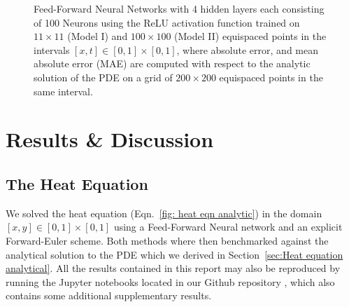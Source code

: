 \documentclass[reprint, english, nofootinbib]{revtex4-2}
\begin{document}
\begin{figure}[h!tb]
{    }
    \caption{\label{fig:ReLU composite figure}Feed-Forward Neural Networks with 4 hidden layers each consisting of 100 Neurons using the ReLU activation function trained on $11\times11$ (Model I) and $100\times100$ (Model II) equispaced points in the intervals $[x,t]\in[0,1]\times[0,1]$, where absolute error, and mean absolute error (MAE) are computed with respect to the analytic solution of the PDE on a grid of $200\times200$ equispaced points in the same interval.}
\end{figure}

\section{Results \& Discussion}

\subsection{The Heat Equation}

\noindent
We solved the heat equation (Eqn.~\ref{fig: heat eqn analytic}) in the domain $[x,y] \in [0,1]\times[0,1]$ using a Feed-Forward Neural network and an explicit Forward-Euler scheme. Both methods where then benchmarked against the analytical solution to the PDE which we derived in Section~\ref{sec:Heat equation analytical}. All the results contained in this report may also be reproduced by running the Jupyter notebooks located in our Github repository \cite{github_repo}, which also contains some additional supplementary results.
\end{document}
